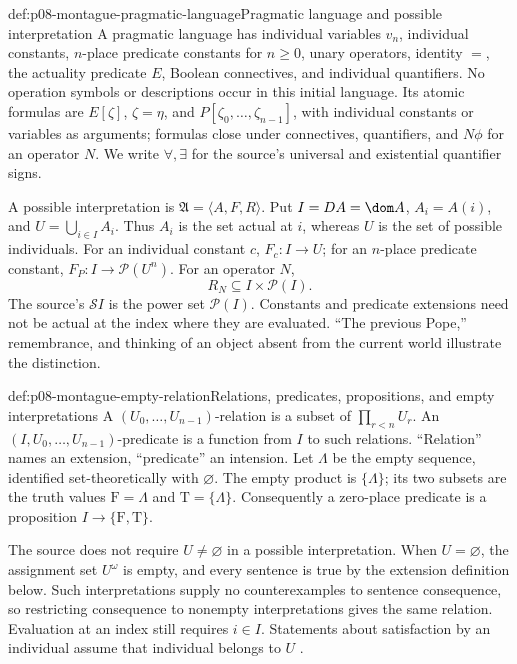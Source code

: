 \begin{hbdefinition}{def:p08-montague-pragmatic-language}{Pragmatic language and possible interpretation}
A pragmatic language has individual variables \(v_n\), individual
constants, \(n\)-place predicate constants for \(n\geq0\), unary
operators, identity \(=\), the actuality predicate \(E\), Boolean
connectives, and individual quantifiers. No operation symbols or
descriptions occur in this initial language. Its atomic formulas are
\(E[\zeta]\), \(\zeta=\eta\), and
\(P[\zeta_0,\ldots,\zeta_{n-1}]\), with individual constants or
variables as arguments; formulas close under connectives, quantifiers,
and \(N\phi\) for an operator \(N\). We write \(\forall,\exists\)
for the source's universal and existential quantifier signs.

A possible interpretation is \(\mathfrak A=\langle A,F,R\rangle\).
Put \(I=DA=\dom A\), \(A_i=A(i)\), and
\(U=\bigcup_{i\in I}A_i\). Thus \(A_i\) is the set actual at
\(i\), whereas \(U\) is the set of possible individuals.
For an individual constant \(c\), \(F_c:I\to U\); for an
\(n\)-place predicate constant, \(F_P:I\to\mathcal P(U^n)\).
For an operator \(N\),
\[
 R_N\subseteq I\times\mathcal P(I).
\]
The source's \(\mathcal S I\) is the power set \(\mathcal P(I)\).
Constants and predicate extensions need not be actual at the index
where they are evaluated. ``The previous Pope,'' remembrance, and thinking
of an object absent from the current world illustrate the distinction.
\end{hbdefinition}

\begin{hbconvention}{def:p08-montague-empty-relation}{Relations, predicates, propositions, and empty interpretations}
A \((U_0,\ldots,U_{n-1})\)-relation is a subset of
\(\prod_{r<n}U_r\). An \((I,U_0,\ldots,U_{n-1})\)-predicate is
a function from \(I\) to such relations. ``Relation'' names an
extension, ``predicate'' an intension. Let \(\Lambda\) be the empty
sequence, identified set-theoretically with \(\varnothing\).
The empty product is \(\{\Lambda\}\); its two subsets are the truth
values \(\mathrm F=\Lambda\) and \(\mathrm T=\{\Lambda\}\).
Consequently a zero-place predicate is a proposition
\(I\to\{\mathrm F,\mathrm T\}\).

The source does not require \(U\ne\varnothing\) in a possible
interpretation. When \(U=\varnothing\), the assignment set
\(U^\omega\) is empty, and every sentence is true by the extension
definition below. Such interpretations supply no counterexamples to
sentence consequence, so restricting consequence to nonempty
interpretations gives the same relation. Evaluation at an index still
requires \(i\in I\). Statements about satisfaction by an individual
assume that individual belongs to \(U\)
\cite[p.~93, note~7]{Montague1970Pragmatics}.
\end{hbconvention}


